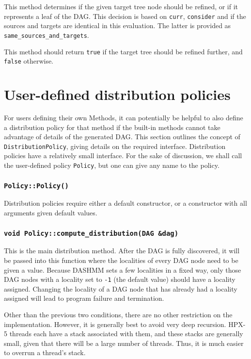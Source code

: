 This method determines if the given target tree node should be refined, or if
it represents a leaf of the DAG. This decision is based on \texttt{curr},
\texttt{consider} and if the sources and targets are identical in this
evaluation. The latter is provided as \texttt{same\_sources\_and\_targets}.

This method should return \texttt{true} if the target tree should be refined
further, and \texttt{false} otherwise.



\section{User-defined distribution policies}

For users defining their own Methods, it can potentially be helpful to also
define a distribution policy for that method if the built-in methods cannot
take advantage of details of the generated DAG. This section outlines the
concept of \texttt{DistributionPolicy}, giving details on the required
interface. Distribution policies have a relatively small interface. For the
sake of discussion, we shall call the user-defined policy \texttt{Policy},
but one can give any name to the policy.

\subsubsection{\texttt{Policy::Policy()}}

Distribution policies require either a default constructor, or a constructor
with all arguments given default values.

\subsubsection{\texttt{void Policy::compute\_distribution(DAG \&dag)}}

This is the main distribution method. After the DAG is fully discovered, it will
be passed into this function where the localities of every DAG node need to be
given a value. Because DASHMM sets a few localities in a fixed way, only those
DAG nodes with a locality set to \texttt{-1} (the default value) should have
a locality assigned. Changing the locality of a DAG node that has already had
a locality assigned will lead to program failure and termination.

Other than the previous two conditions, there are no other restriction on the
implementation. However, it is generally best to avoid very deep recursion.
HPX-5 threads each have a stack associated with them, and these stacks are
generally small, given that there will be a large number of threads. Thus, it
is much easier to overrun a thread's stack.

